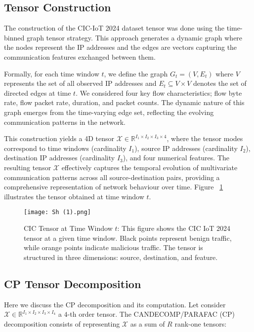 \documentclass[preprint,12pt,authoryear]{elsarticle}
\begin{document}
\subsection{Tensor Construction}
The construction of the CIC-IoT 2024 dataset tensor was done using the time-binned graph tensor strategy. This approach generates a dynamic graph where the nodes represent the IP addresses and the edges are vectors capturing the communication features exchanged between them. 

Formally, for each time window $t$, we define the graph $G_t = (V, E_t)$ where $V$ represents the set of all observed IP addresses and $E_t \subseteq V \times V$ denotes the set of directed edges at time $t$. We considered four key flow characteristics; flow byte rate, flow packet rate, duration, and packet counts. The dynamic nature of this graph emerges from the time-varying edge set, reflecting the evolving communication patterns in the network. 

This construction yields a 4D tensor $\mathcal{X} \in \mathbb{R}^{I_1 \times I_2 \times I_3 \times 4}$, where the tensor modes correspond to time windows (cardinality $I_1$), source IP addresses (cardinality $I_2$), destination IP addresses (cardinality $I_3$), and four numerical features. The resulting tensor $\mathcal{X}$ effectively captures the temporal evolution of multivariate communication patterns across all source-destination pairs, providing a comprehensive representation of network behaviour  over time. Figure ~\ref{fig:tensor_3d} illustrates the tensor obtained at time window $t$.

\begin{figure}[H]
    \centering
    \texttt{[image: Sh (1).png]}
    \caption{CIC Tensor at Time Window $t$: This figure shows the CIC IoT 2024 tensor at a given time window. Black points represent benign traffic, while orange points indicate malicious traffic. The tensor is structured in three dimensions: source, destination, and feature.}

    \label{fig:tensor_3d}
\end{figure}

\subsection{CP Tensor Decomposition}
Here we discuss the CP decomposition and its computation. 
Let consider $\mathcal{X} \in \mathbb{R}^{I_1 \times I_2 \times I_3 \times I_4}$ a $4$-th order tensor. The CANDECOMP/PARAFAC (CP) decomposition consists of representing $\mathcal{X}$ as a sum of $R$ rank-one tensors:
\end{document}
